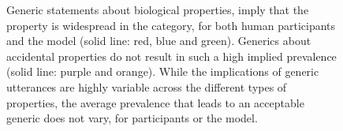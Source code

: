 \documentclass{pnastwo}
\begin{document}
\begin{article}
\begin{figure}
{    %
    Generic statements about biological properties, imply that the property is widespread in the category, for both human participants and the model (solid line: red, blue and green). 
    Generics about accidental properties do not result in such a high implied prevalence (solid line: purple and orange).  
	While the implications of generic utterances are highly variable across the different types of properties, the average prevalence that leads to an acceptable generic does not vary, for participants or the model.
}
  \label{fig:exp2b}
\end{figure}





%


\end{article}
\end{document}
